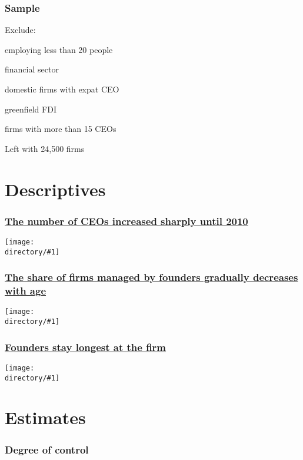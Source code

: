 \documentclass[aspectratio=43,compress,mathserif]{beamer}
\newcommand{\directory}{..}
\newcommand{\longfigure}[2]{\begin{frame}\frametitle{\hyperlink{#1back}{#2}}\hypertarget{#1}{{\begin{center}\texttt{[image: \\directory/\#1]}\end{center}}}\end{frame}}
\begin{document}
\begin{frame}\frametitle{Sample}\hypertarget{Sample}{}
\item Exclude: 
\item employing less than 20 people
\item financial sector
\item domestic firms with expat CEO
\item greenfield FDI
\item firms with more than 15 CEOs
\item Left with 24,500 firms


\end{frame}







\section{Descriptives}\hypertarget{Descriptives}{}
\longfigure{input/ceo-panel/fig/manager-type-by-year/fig.pdf}{The number of CEOs increased sharply until 2010}
\longfigure{input/ceo-panel/fig/manager-type-by-age/fig.pdf}{The share of firms managed by founders gradually decreases with age}
\longfigure{input/ceo-panel/fig/tenure-by-type-weighted/fig.pdf}{Founders stay longest at the firm}








\section{Estimates}\hypertarget{Estimates}{}


\begin{frame}\frametitle{Degree of control}\hypertarget{Degree of control}{}


\end{frame}
\end{document}

